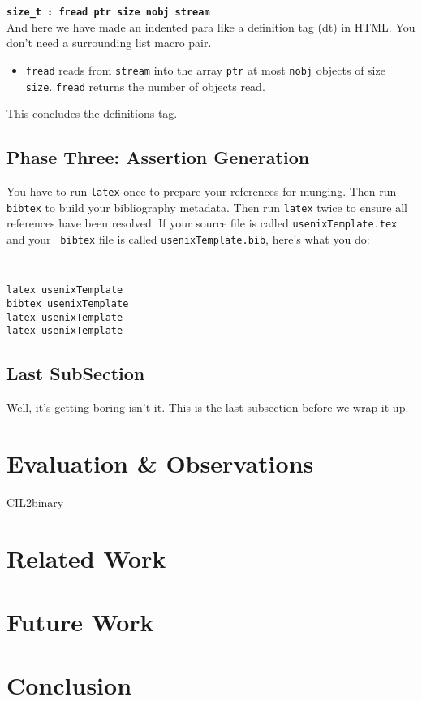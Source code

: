 \documentclass[letterpaper,twocolumn,10pt]{article}
\begin{document}
\noindent
{\bf \tt size\_t : fread ptr size nobj stream } \\

And here we have made an indented para like a definition tag (dt)
in HTML.  You don't need a surrounding list macro pair.
\begin{itemize}
\item[]  {\tt fread} reads from {\tt stream} into the array {\tt ptr} at
most {\tt nobj} objects of size {\tt size}.   {\tt fread} returns
the number of objects read. 
\end{itemize}
This concludes the definitions tag.

\subsection{Phase Three: Assertion Generation}

You have to run {\tt latex} once to prepare your references for
munging.  Then run {\tt bibtex} to build your bibliography metadata.
Then run {\tt latex} twice to ensure all references have been resolved.
If your source file is called {\tt usenixTemplate.tex} and your {\tt
  bibtex} file is called {\tt usenixTemplate.bib}, here's what you do:
{\tt \small
\begin{verbatim}
latex usenixTemplate
bibtex usenixTemplate
latex usenixTemplate
latex usenixTemplate
\end{verbatim}
}


\subsection{Last SubSection}

Well, it's getting boring isn't it.  This is the last subsection
before we wrap it up.

\section{Evaluation \& Observations}CIL2binary

\section{Related Work}

\section{Future Work}

\section{Conclusion}
\end{document}
